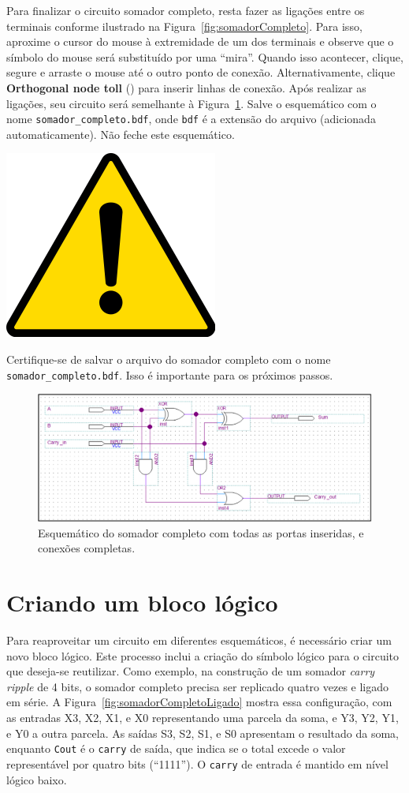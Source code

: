 \documentclass[12pt,a4paper]{article}
\newcommand{\Attention}[1]{
    \begin{tcolorbox}[colback=red!5!white, colframe=red!75!black]
        \noindent
        \begin{minipage}[c]{1cm}%
            \includegraphics[width=\linewidth]{figs/attention.png}
        \end{minipage}%
        \hfill%
        \begin{minipage}[c]{\dimexpr\linewidth-1cm-2mm}%
            \begin{center}
                #1    
            \end{center}            
        \end{minipage}
    \end{tcolorbox}
}
\begin{document}
Para finalizar o circuito somador completo, resta fazer as ligações entre os terminais conforme ilustrado na Figura~\ref{fig:somadorCompleto}. Para isso, aproxime o cursor do mouse à extremidade de um dos terminais e observe que o símbolo do mouse será substituído por uma ``mira''. Quando isso acontecer, clique, segure e arraste o mouse até o outro ponto de conexão. Alternativamente, clique \textbf{Orthogonal node toll} () para inserir linhas de conexão. Após realizar as ligações, seu circuito será semelhante à Figura~\ref{fig:somadorFeito}. Salve o esquemático com o nome \texttt{somador\_completo.bdf}, onde \texttt{bdf} é a extensão do arquivo (adicionada automaticamente). Não feche este esquemático.

\Attention{Certifique-se de salvar o arquivo do somador completo com o nome \texttt{somador\_completo.bdf}. Isso é importante para os próximos passos.}

\begin{figure}[htbp!]
    \centering
    \includegraphics[width=\textwidth]{./figs/somadorFeito.png}
    \caption{Esquemático do somador completo com todas as portas inseridas, e conexões completas.}
    \label{fig:somadorFeito}
\end{figure}

\section{Criando um bloco lógico}

Para reaproveitar um circuito em diferentes esquemáticos, é necessário criar um novo bloco lógico. Este processo inclui a criação do símbolo lógico para o circuito que deseja-se reutilizar. Como exemplo, na construção de um somador \textit{carry ripple} de 4 bits, o somador completo precisa ser replicado quatro vezes e ligado em série. A Figura~\ref{fig:somadorCompletoLigado} mostra essa configuração, com as entradas X3, X2, X1, e X0 representando uma parcela da soma, e Y3, Y2, Y1, e Y0 a outra parcela. As saídas S3, S2, S1, e S0 apresentam o resultado da soma, enquanto \texttt{Cout} é o \texttt{carry} de saída, que indica se o total excede o valor representável por quatro bits (``1111''). O \texttt{carry} de entrada é mantido em nível lógico baixo.
\end{document}
